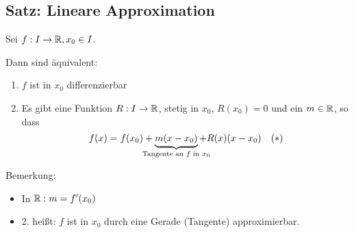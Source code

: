 \documentclass[10pt, a4paper, fleqn]{article}
\begin{document}
\subsection{Satz: Lineare Approximation}

Sei $f: I \to \mathbb{R}, x_0 \in I$.

Dann sind äquivalent:
\begin{enumerate}[1.]
    \item $f$ ist in $x_0$ differenzierbar
    \item Es gibt eine Funktion $R: I \to \mathbb{R}$, stetig in $x_0$, $R(x_0) = 0$ und ein
    $m \in \mathbb{R}$, so dass
    \[
        f(x) = f(x_0) + \underbrace{m(x - x_0)}_{\mathclap{\text{Tangente an $f$ in $x_0$}}}
        + R(x)(x - x_0) \quad (*)    
    \]
\end{enumerate}

Bemerkung: \begin{itemize}
    \item In $\mathbb{R}: m = f'(x_0)$
    \item 2. heißt: $f$ ist in $x_0$ durch eine Gerade (Tangente) approximierbar.
\end{itemize}

\ifdefined\MAINDOC\else
\end{document}
